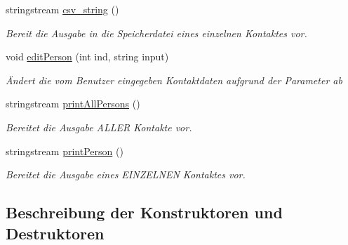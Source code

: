 \begin{DoxyCompactItemize}
stringstream \hyperlink{classContactManager_1_1Person_a3bc1692664e68de81b431caa6a77510b}{csv\+\_\+string} ()
\begin{DoxyCompactList}\small\item\em Bereit die Ausgabe in die Speicherdatei eines einzelnen Kontaktes vor.\end{DoxyCompactList}\item 
void \hyperlink{classContactManager_1_1Person_a90d0e64d4db9d19843a343c6f9564555}{edit\+Person} (int ind, string input)
\begin{DoxyCompactList}\small\item\em Ändert die vom Benutzer eingegeben Kontaktdaten aufgrund der Parameter ab\end{DoxyCompactList}\item 
stringstream \hyperlink{classContactManager_1_1Person_a781616d2e1b0ebe4601b3914d4a03bc3}{print\+All\+Persons} ()
\begin{DoxyCompactList}\small\item\em Bereitet die Ausgabe A\+L\+L\+ER Kontakte vor.\end{DoxyCompactList}\item 
stringstream \hyperlink{classContactManager_1_1Person_ab1be17c0aac5d094a6fd94d9e1fa7ed4}{print\+Person} ()
\begin{DoxyCompactList}\small\item\em Bereitet die Ausgabe eines E\+I\+N\+Z\+E\+L\+N\+EN Kontaktes vor.\end{DoxyCompactList}\end{DoxyCompactItemize}


\subsection{Beschreibung der Konstruktoren und Destruktoren}
\mbox{\label{classContactManager_1_1Person_ab1082b4e670d792fa0e7089a1834f2a2}} 
